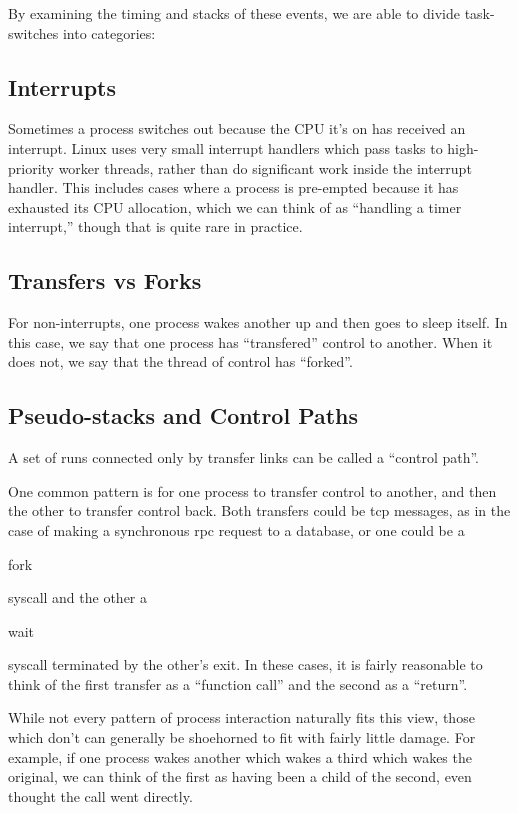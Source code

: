 \documentclass[10pt]{article}
\begin{document}
By examining the timing and stacks of these events, we are able to divide task-switches into categories:

\subsection{Interrupts}

Sometimes a process switches out because the CPU it's on has received an interrupt.  Linux uses very small interrupt handlers which pass tasks to high-priority worker threads, rather than do significant work inside the interrupt handler.  This includes cases where a process is pre-empted because it has exhausted its CPU allocation, which we can think of as ``handling a timer interrupt,'' though that is quite rare in practice.

\subsection{Transfers vs Forks}

For non-interrupts, one process wakes another up and then goes to sleep itself.  In this case, we say that one process has ``transfered'' control to another.  When it does not, we say that the thread of control has ``forked''.

\subsection{Pseudo-stacks and Control Paths}

A set of runs connected only by transfer links can be called a ``control path''.

One common pattern is for one process to transfer control to another, and then the other to transfer control back.  Both transfers could be tcp messages, as in the case of making a synchronous rpc request to a database, or one could be a \begin{tt}fork\end{tt} syscall and the other a \begin{tt}wait\end{tt} syscall terminated by the other's exit.  In these cases, it is fairly reasonable to think of the first transfer as a ``function call'' and the second as a ``return''.

While not every pattern of process interaction naturally fits this view, those which don't can generally be shoehorned to fit with fairly little damage.  For example, if one process wakes another which wakes a third which wakes the original, we can think of the first as having been a child of the second, even thought the call went directly.
\end{document}

